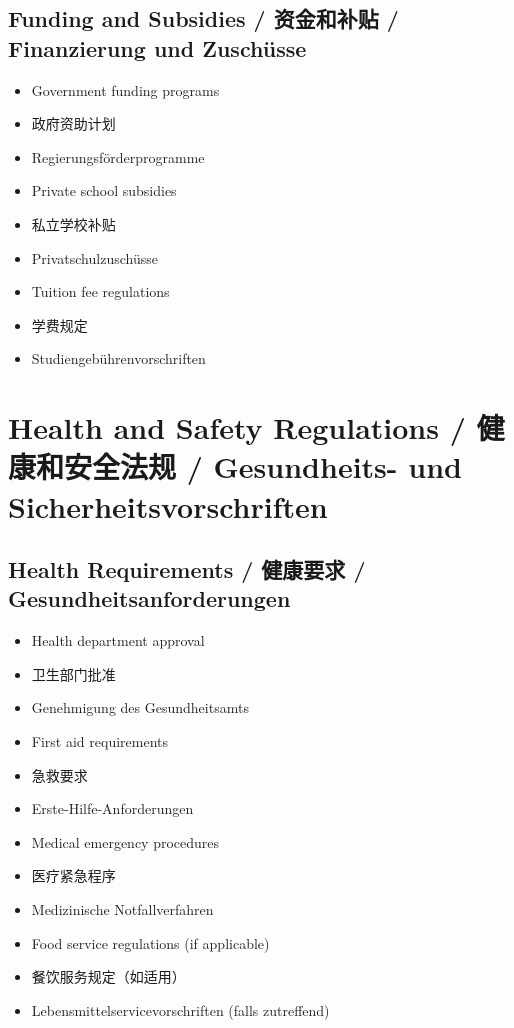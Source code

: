 \subsection{Funding and Subsidies / 资金和补贴 / Finanzierung und Zuschüsse}
\begin{itemize}
    \item Government funding programs
    \item 政府资助计划
    \item Regierungsförderprogramme
    \item Private school subsidies
    \item 私立学校补贴
    \item Privatschulzuschüsse
    \item Tuition fee regulations
    \item 学费规定
    \item Studiengebührenvorschriften
\end{itemize}

\section{Health and Safety Regulations / 健康和安全法规 / Gesundheits- und Sicherheitsvorschriften}

\subsection{Health Requirements / 健康要求 / Gesundheitsanforderungen}
\begin{itemize}
    \item Health department approval
    \item 卫生部门批准
    \item Genehmigung des Gesundheitsamts
    \item First aid requirements
    \item 急救要求
    \item Erste-Hilfe-Anforderungen
    \item Medical emergency procedures
    \item 医疗紧急程序
    \item Medizinische Notfallverfahren
    \item Food service regulations (if applicable)
    \item 餐饮服务规定（如适用）
    \item Lebensmittelservicevorschriften (falls zutreffend)
\end{itemize}


